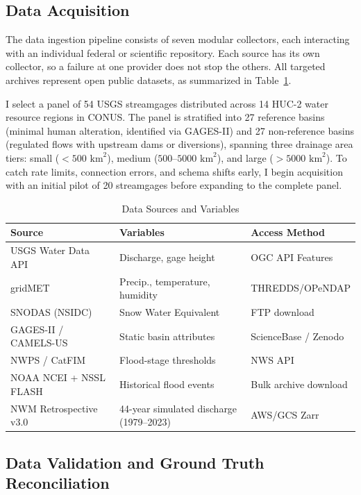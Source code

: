 \documentclass[12pt]{report}
\begin{document}
\subsection{Data Acquisition}

The data ingestion pipeline consists of seven modular collectors, each interacting with an individual federal or scientific repository. Each source has its own collector, so a failure at one provider does not stop the others. All targeted archives represent open public datasets, as summarized in Table~\ref{tab:datasources}.

I select a panel of 54 USGS streamgages distributed across 14 HUC-2 water resource regions in CONUS. The panel is stratified into 27 reference basins (minimal human alteration, identified via GAGES-II) and 27 non-reference basins (regulated flows with upstream dams or diversions), spanning three drainage area tiers: small ($<500\text{ km}^2$), medium ($500\text{--}5000\text{ km}^2$), and large ($>5000\text{ km}^2$). To catch rate limits, connection errors, and schema shifts early, I begin acquisition with an initial pilot of 20 streamgages before expanding to the complete panel.

\begin{table}[h]
  \caption{Data Sources and Variables}
  \label{tab:datasources}
  \centering
  \begin{tabular}{|p{3.2cm}|p{4.5cm}|p{4cm}|}
    \hline
    \textbf{Source} & \textbf{Variables} & \textbf{Access Method} \\
    \hline
    USGS Water Data API & Discharge, gage height & OGC API Features \\
    \hline
    gridMET & Precip., temperature, humidity & THREDDS/OPeNDAP \\
    \hline
    SNODAS (NSIDC) & Snow Water Equivalent & FTP download \\
    \hline
    GAGES-II / CAMELS-US & Static basin attributes & ScienceBase / Zenodo \\
    \hline
    NWPS / CatFIM & Flood-stage thresholds & NWS API \\
    \hline
    NOAA NCEI + NSSL FLASH & Historical flood events & Bulk archive download \\
    \hline
    NWM Retrospective v3.0 & 44-year simulated discharge (1979--2023) & AWS/GCS Zarr \\
    \hline
  \end{tabular}
\end{table}

\subsection{Data Validation and Ground Truth Reconciliation}
\end{document}
